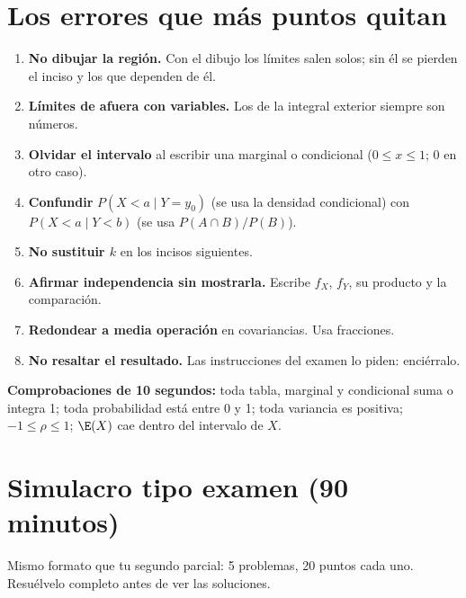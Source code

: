 \section{Los errores que m\'as puntos quitan}

\begin{enumerate}
\item \textbf{No dibujar la regi\'on.} Con el dibujo los l\'imites salen solos; sin \'el se pierden el inciso y los que dependen de \'el.
\item \textbf{L\'imites de afuera con variables.} Los de la integral exterior siempre son n\'umeros.
\item \textbf{Olvidar el intervalo} al escribir una marginal o condicional (\guillemotleft$0\le x\le1$; 0 en otro caso\guillemotright).
\item \textbf{Confundir} $P(X<a\mid Y=y_0)$ (se usa la densidad condicional) con $P(X<a\mid Y<b)$ (se usa $P(A\cap B)/P(B)$).
\item \textbf{No sustituir $k$} en los incisos siguientes.
\item \textbf{Afirmar independencia sin mostrarla.} Escribe $f_X$, $f_Y$, su producto y la comparaci\'on.
\item \textbf{Redondear a media operaci\'on} en covariancias. Usa fracciones.
\item \textbf{No resaltar el resultado.} Las instrucciones del examen lo piden: enci\'erralo.
\end{enumerate}

\textbf{Comprobaciones de 10 segundos:} toda tabla, marginal y condicional suma o integra 1; toda probabilidad est\'a
entre 0 y 1; toda variancia es positiva; $-1\le\rho\le1$; $\E(X)$ cae dentro del intervalo de $X$.

\section{Simulacro tipo examen (90 minutos)}

Mismo formato que tu segundo parcial: 5 problemas, 20 puntos cada uno. Resu\'elvelo completo antes de ver las soluciones.

